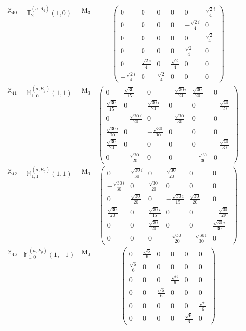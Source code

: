 \documentclass[fleqn,10pt,landscape]{article}
\begin{document}
\begin{itemize}
\begin{center}
\begin{longtable}{c|c|c|c}
$ \mathbb{X}_{40} $ & $\mathbb{T}_{2}^{(a,A_{g})}(1,0)$ & M$_{3}$ & $\begin{pmatrix} 0 & 0 & 0 & 0 & 0 & \frac{\sqrt{2} i}{4} \\ 0 & 0 & 0 & 0 & - \frac{\sqrt{2} i}{4} & 0 \\ 0 & 0 & 0 & 0 & 0 & \frac{\sqrt{2}}{4} \\ 0 & 0 & 0 & 0 & \frac{\sqrt{2}}{4} & 0 \\ 0 & \frac{\sqrt{2} i}{4} & 0 & \frac{\sqrt{2}}{4} & 0 & 0 \\ - \frac{\sqrt{2} i}{4} & 0 & \frac{\sqrt{2}}{4} & 0 & 0 & 0 \end{pmatrix}$ \\
$ \mathbb{X}_{41} $ & $\mathbb{M}_{1,0}^{(a,E_{g})}(1,1)$ & M$_{3}$ & $\begin{pmatrix} 0 & \frac{\sqrt{30}}{15} & 0 & - \frac{\sqrt{30} i}{20} & \frac{\sqrt{30}}{20} & 0 \\ \frac{\sqrt{30}}{15} & 0 & \frac{\sqrt{30} i}{20} & 0 & 0 & - \frac{\sqrt{30}}{20} \\ 0 & - \frac{\sqrt{30} i}{20} & 0 & - \frac{\sqrt{30}}{30} & 0 & 0 \\ \frac{\sqrt{30} i}{20} & 0 & - \frac{\sqrt{30}}{30} & 0 & 0 & 0 \\ \frac{\sqrt{30}}{20} & 0 & 0 & 0 & 0 & - \frac{\sqrt{30}}{30} \\ 0 & - \frac{\sqrt{30}}{20} & 0 & 0 & - \frac{\sqrt{30}}{30} & 0 \end{pmatrix}$ \\
$ \mathbb{X}_{42} $ & $\mathbb{M}_{1,1}^{(a,E_{g})}(1,1)$ & M$_{3}$ & $\begin{pmatrix} 0 & \frac{\sqrt{30} i}{30} & 0 & \frac{\sqrt{30}}{20} & 0 & 0 \\ - \frac{\sqrt{30} i}{30} & 0 & \frac{\sqrt{30}}{20} & 0 & 0 & 0 \\ 0 & \frac{\sqrt{30}}{20} & 0 & - \frac{\sqrt{30} i}{15} & \frac{\sqrt{30}}{20} & 0 \\ \frac{\sqrt{30}}{20} & 0 & \frac{\sqrt{30} i}{15} & 0 & 0 & - \frac{\sqrt{30}}{20} \\ 0 & 0 & \frac{\sqrt{30}}{20} & 0 & 0 & \frac{\sqrt{30} i}{30} \\ 0 & 0 & 0 & - \frac{\sqrt{30}}{20} & - \frac{\sqrt{30} i}{30} & 0 \end{pmatrix}$ \\
$ \mathbb{X}_{43} $ & $\mathbb{M}_{1,0}^{(a,E_{g})}(1,-1)$ & M$_{3}$ & $\begin{pmatrix} 0 & \frac{\sqrt{6}}{6} & 0 & 0 & 0 & 0 \\ \frac{\sqrt{6}}{6} & 0 & 0 & 0 & 0 & 0 \\ 0 & 0 & 0 & \frac{\sqrt{6}}{6} & 0 & 0 \\ 0 & 0 & \frac{\sqrt{6}}{6} & 0 & 0 & 0 \\ 0 & 0 & 0 & 0 & 0 & \frac{\sqrt{6}}{6} \\ 0 & 0 & 0 & 0 & \frac{\sqrt{6}}{6} & 0 \end{pmatrix}$ \\

\end{longtable}
\end{center}
\end{itemize}
\end{document}
